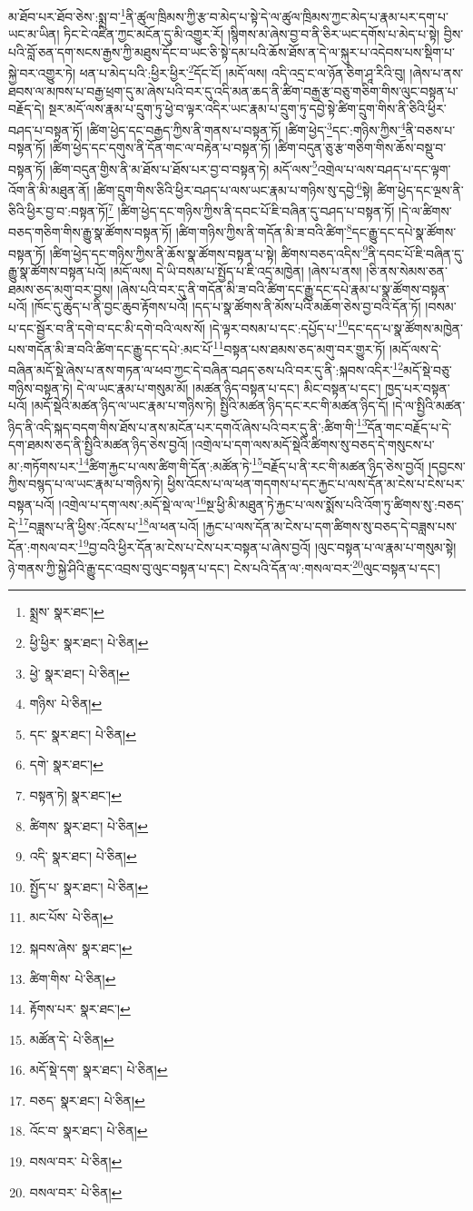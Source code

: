 མ་ཐོབ་པར་ཐོབ་ཅེས་:སྨྲ་བ་\footnote{སྨྲས་  སྣར་ཐང་། }ནི་ཚུལ་ཁྲིམས་ཀྱི་རྩ་བ་མེད་པ་སྟེ་དེ་ལ་ཚུལ་ཁྲིམས་ཀྱང་མེད་པ་རྣམ་པར་དག་པ་ཡང་མ་ཡིན། ཏིང་ངེ་འཛིན་ཀྱང་མངོན་དུ་མི་འགྱུར་རོ། །སྙིགས་མ་ཞེས་བྱ་བ་ནི་ཅིར་ཡང་དགོས་པ་མེད་པ་སྟེ། བྱིས་པའི་བློ་ཅན་དག་སངས་རྒྱས་ཀྱི་མཐུས་དོང་བ་ཡང་ཅི་སྟེ་དམ་པའི་ཆོས་ཐོས་ན་དེ་ལ་སྐུར་པ་འདེབས་པས་སྡིག་པ་སྐྱེ་བར་འགྱུར་ཏེ། ཕན་པ་མེད་པའི་:ཕྱིར་ཕྱིར་\footnote{ཕྱི་ཕྱིར་  སྣར་ཐང་།  པེ་ཅིན། }དོང་ངོ། །མདོ་ལས། འདི་འདྲ་ང་ལ་ཉོན་ཅིག་ཤཱ་རིའི་བུ། །ཞེས་པ་ནས་ཐབས་ལ་མཁས་པ་བརྒྱ་ཕྲག་དུ་མ་ཞེས་པའི་བར་དུ་འདི་མན་ཆད་ནི་ཚིག་བརྒྱ་རྩ་བཅུ་གཅིག་གིས་ལུང་བསྟན་པ་བརྗོད་དེ། སྔར་མདོ་ལས་རྣམ་པ་དྲུག་ཏུ་ཕྱེ་བ་ལྟར་འདིར་ཡང་རྣམ་པ་དྲུག་ཏུ་དབྱེ་སྟེ་ཚིག་དྲུག་གིས་ནི་ཅིའི་ཕྱིར་བཤད་པ་བསྟན་ཏོ། །ཚིག་ཕྱེད་དང་བརྒྱད་ཀྱིས་ནི་གནས་པ་བསྟན་ཏོ། །ཚིག་ཕྱེད་\footnote{ཕྱེ་  སྣར་ཐང་།  པེ་ཅིན། }དང་:གཉིས་ཀྱིས་\footnote{གཉིས་  པེ་ཅིན། }ནི་བཅས་པ་བསྟན་ཏོ། །ཚིག་ཕྱེད་དང་དགུས་ནི་དོན་གང་ལ་བརྟེན་པ་བསྟན་ཏོ། །ཚིག་བདུན་ཅུ་རྩ་གཅིག་གིས་ཆོས་བསྡུ་བ་བསྟན་ཏོ། །ཚིག་བདུན་གྱིས་ནི་མ་ཐོས་པ་ཐོས་པར་བྱ་བ་བསྟན་ཏེ། མདོ་ལས་\footnote{དང་  སྣར་ཐང་།  པེ་ཅིན། }འགྲེལ་པ་ལས་བཤད་པ་དང་ལྟག་འོག་ནི་མི་མཐུན་ནོ། །ཚིག་དྲུག་གིས་ཅིའི་ཕྱིར་བཤད་པ་ལས་ཡང་རྣམ་པ་གཉིས་སུ་དབྱེ་\footnote{དགེ་  སྣར་ཐང་། }སྟེ། ཚིག་ཕྱེད་དང་ལྔས་ནི་ཅིའི་ཕྱིར་བྱ་བ་:བསྟན་ཏོ།\footnote{བསྟན་ཏེ།  སྣར་ཐང་། } །ཚིག་ཕྱེད་དང་གཉིས་ཀྱིས་ནི་དབང་པོ་ཇི་བཞིན་དུ་བཤད་པ་བསྟན་ཏོ། །དེ་ལ་ཚིགས་བཅད་གཅིག་གིས་རྒྱུ་སྣ་ཚོགས་བསྟན་ཏོ། །ཚིག་གཉིས་ཀྱིས་ནི་གདོན་མི་ཟ་བའི་ཚིག་\footnote{ཚིགས་  སྣར་ཐང་།  པེ་ཅིན། }དང་རྒྱུ་དང་དཔེ་སྣ་ཚོགས་བསྟན་ཏོ། །ཚིག་ཕྱེད་དང་གཉིས་ཀྱིས་ནི་ཆོས་སྣ་ཚོགས་བསྟན་པ་སྟེ། ཚིགས་བཅད་འདིས་\footnote{འདི་  སྣར་ཐང་།  པེ་ཅིན། }ནི་དབང་པོ་ཇི་བཞིན་དུ་རྒྱུ་སྣ་ཚོགས་བསྟན་པའོ། །མདོ་ལས། དེ་ཡི་བསམ་པ་སྤྱོད་པ་ཇི་འདྲ་མཁྱེན། །ཞེས་པ་ནས། །ཅི་ནས་སེམས་ཅན་ཐམས་ཅད་མགུ་བར་བྱས། །ཞེས་པའི་བར་དུ་ནི་གདོན་མི་ཟ་བའི་ཚིག་དང་རྒྱུ་དང་དཔེ་རྣམ་པ་སྣ་ཚོགས་བསྟན་པའོ། །ཁོང་དུ་ཆུད་པ་ནི་བྱང་ཆུབ་རྟོགས་པའོ། །དད་པ་སྣ་ཚོགས་ནི་མོས་པའི་མཆོག་ཅེས་བྱ་བའི་དོན་ཏོ། །བསམ་པ་དང་སྦྱོར་བ་ནི་དགེ་བ་དང་མི་དགེ་བའི་ལས་སོ། །དེ་ལྟར་བསམ་པ་དང་:དཔྱོད་པ་\footnote{སྤྱོད་པ་  སྣར་ཐང་།  པེ་ཅིན། }དང་དད་པ་སྣ་ཚོགས་མཁྱེན་པས་གདོན་མི་ཟ་བའི་ཚིག་དང་རྒྱུ་དང་དཔེ་:མང་པོ་\footnote{མང་པོས་  པེ་ཅིན། }བསྟན་པས་ཐམས་ཅད་མགུ་བར་གྱུར་ཏོ། །མདོ་ལས་དེ་བཞིན་མདོ་སྡེ་ཞེས་པ་ནས་གཏན་ལ་ཕབ་ཀྱང་དེ་བཞིན་བཤད་ཅས་པའི་བར་དུ་ནི་:སྐབས་འདིར་\footnote{སྐབས་ཞེས་  སྣར་ཐང་། }མདོ་སྡེ་བཅུ་གཉིས་བསྟན་ཏེ། དེ་ལ་ཡང་རྣམ་པ་གསུམ་མོ། །མཚན་ཉིད་བསྟན་པ་དང་། མིང་བསྟན་པ་དང་། ཁྱད་པར་བསྟན་པའོ། །མདོ་སྡེའི་མཚན་ཉིད་ལ་ཡང་རྣམ་པ་གཉིས་ཏེ། སྤྱིའི་མཚན་ཉིད་དང་རང་གི་མཚན་ཉིད་དོ། །དེ་ལ་སྤྱིའི་མཚན་ཉིད་ནི་འདི་སྐད་བདག་གིས་ཐོས་པ་ནས་མངོན་པར་དགའོ་ཞེས་པའི་བར་དུ་ནི་:ཚིག་གི་\footnote{ཚིག་གིས་  པེ་ཅིན། }དོན་གང་བརྗོད་པ་དེ་དག་ཐམས་ཅད་ནི་སྤྱིའི་མཚན་ཉིད་ཅེས་བྱའོ། །འགྲེལ་པ་དག་ལས་མདོ་སྡེའི་ཚིགས་སུ་བཅད་དེ་གསུངས་པ་མ་:གཏོགས་པར་\footnote{རྟོགས་པར་  སྣར་ཐང་། }ཚིག་རྐྱང་པ་ལས་ཚིག་གི་དོན་:མཚོན་ཏེ་\footnote{མཚོན་དེ་  པེ་ཅིན། }བརྗོད་པ་ནི་རང་གི་མཚན་ཉིད་ཅེས་བྱའོ། །དབྱངས་ཀྱིས་བསྙད་པ་ལ་ཡང་རྣམ་པ་གཉིས་ཏེ། ཕྱིས་འོངས་པ་ལ་ཕན་གདགས་པ་དང་རྐྱང་པ་ལས་དོན་མ་ངེས་པ་ངེས་པར་བསྟན་པའོ། །འགྲེལ་པ་དག་ལས་:མདོ་སྡེ་ལ་ལ་\footnote{མདོ་སྡེ་དག་  སྣར་ཐང་།  པེ་ཅིན། }སྔ་ཕྱི་མི་མཐུན་ཏེ་རྐྱང་པ་ལས་སྨོས་པའི་འོག་ཏུ་ཚིགས་སུ་:བཅད་དེ་\footnote{བཅད་  སྣར་ཐང་།  པེ་ཅིན། }བཟླས་པ་ནི་ཕྱིས་:འོངས་པ་\footnote{འོང་བ་  སྣར་ཐང་།  པེ་ཅིན། }ལ་ཕན་པའོ། །རྐྱང་པ་ལས་དོན་མ་ངེས་པ་དག་ཚིགས་སུ་བཅད་དེ་བཟླས་པས་དོན་:གསལ་བར་\footnote{བསལ་བར་  པེ་ཅིན། }བྱ་བའི་ཕྱིར་དོན་མ་ངེས་པ་ངེས་པར་བསྟན་པ་ཞེས་བྱའོ། །ལུང་བསྟན་པ་ལ་རྣམ་པ་གསུམ་སྟེ། ཉེ་གནས་ཀྱི་སྐྱེ་ཤིའི་རྒྱུ་དང་འབྲས་བུ་ལུང་བསྟན་པ་དང་། ངེས་པའི་དོན་ལ་:གསལ་བར་\footnote{བསལ་བར་  པེ་ཅིན། }ལུང་བསྟན་པ་དང་། 